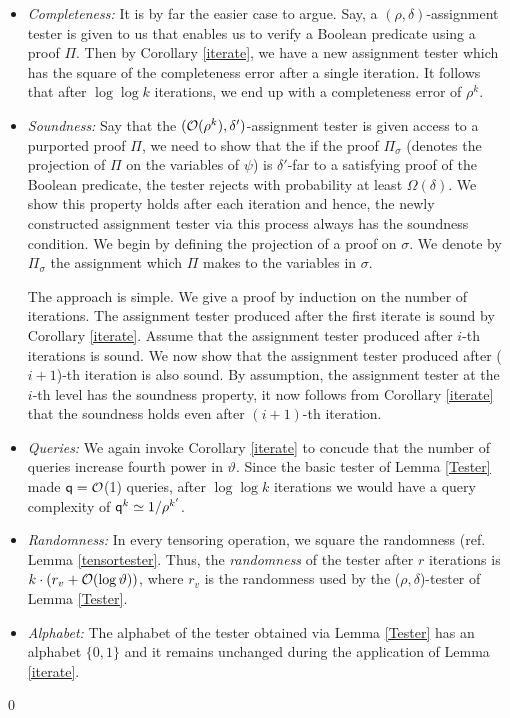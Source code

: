 \begin{itemize}
\item {\em Completeness:} It is by far the easier case to argue. Say,
  a $(\rho, \delta)$-assignment tester is given to us that enables us
  to verify a Boolean predicate using a proof $\Pi$. Then by Corollary
  \ref{iterate}, we have a new assignment tester which has the square
  of the completeness error after a single iteration. It follows that
  after $\log \log k$ iterations, we end up with a completeness error
  of ${\rho^k}$.

\item {\em Soundness:} Say that the $({\cal
    O}(\rho^k),\delta')$-assignment tester is given access to a
  purported proof $\Pi$, we need to show that the if the proof
  $\Pi_{\sigma}$ (denotes the projection of $\Pi$ on the variables of
  $\psi$) is $\delta'$-far to a satisfying proof of the Boolean
  predicate, the tester rejects with probability at least
  $\Omega(\delta)$. We show this property holds after each iteration
  and hence, the newly constructed assignment tester via this process
  always has the soundness condition. We begin by defining the
  projection of a proof on $\sigma$.  We denote by $\Pi_\sigma$ the
  assignment which $\Pi$ makes to the variables in $\sigma$.

  The approach is simple. We give a proof by induction on the number
  of iterations. The assignment tester produced after the first
  iterate is sound by Corollary \ref{iterate}. Assume that the
  assignment tester produced after $i$-th iterations is sound. We now
  show that the assignment tester produced after ($i+1$)-th iteration
  is also sound.  By assumption, the assignment tester at the $i$-th
  level has the soundness property, it now follows from Corollary
  \ref{iterate} that the soundness holds even after $(i+1)$-th
  iteration.

\item {\em Queries:} We again invoke Corollary \ref{iterate} to
  concude that the number of queries increase fourth power in
  $\vartheta$. Since the basic tester of Lemma \ref{Tester} made ${\sf q} =
  {\cal O}$(1) queries, after $\log \log k$ iterations we would have a
  query complexity of ${\sf q}^{k} \simeq 1/\rho^{k'}$.

\item {\em Randomness:} In every tensoring operation,
  we square the randomness (ref. Lemma \ref{tensortester}. Thus, the {\em
  randomness} of the tester after $r$ iterations is $k \cdot (r_v
  + {\cal O}(\log \vartheta))$, where $r_v$ is the
randomness used by the ($\rho, \delta$)-tester of Lemma \ref{Tester}. 

\item {\em Alphabet:} The alphabet of the tester obtained via Lemma \ref{Tester} 
has an alphabet $\{ 0,1\}$ and it remains unchanged during the application of Lemma \ref{iterate}.
\end{itemize}
\qed



